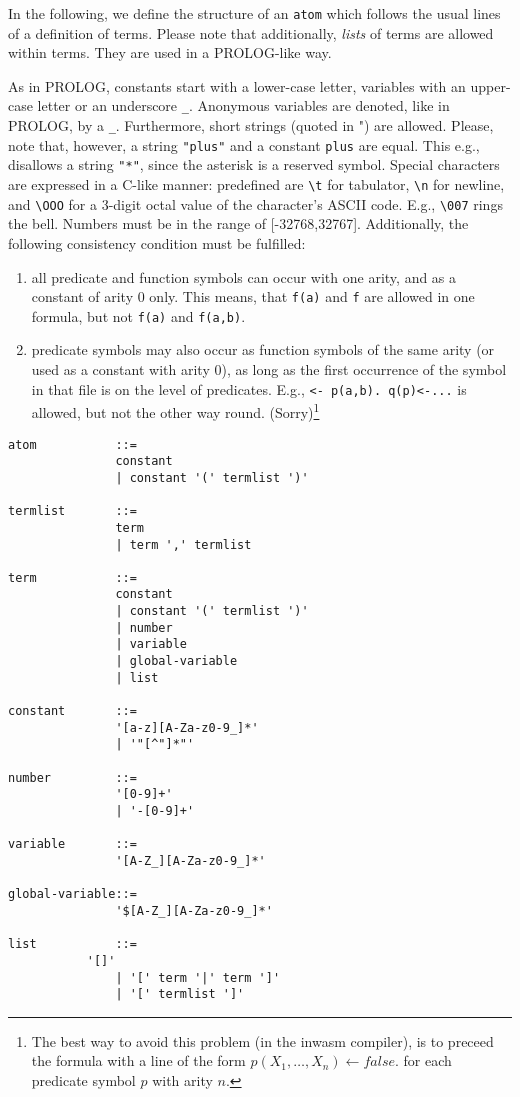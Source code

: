 In the following, we define the structure of an {\tt atom} which
follows the usual lines of a definition of terms. Please note
that additionally, {\em lists\/} of terms are allowed within
terms. They are used in a PROLOG-like way.

As in PROLOG, constants start with a lower-case letter,
variables with an upper-case letter or an underscore {\tt \_}.
Anonymous variables are denoted, like in PROLOG, by a {\tt\_}.
Furthermore, short strings (quoted in ") are allowed. Please, note
that, however, a string {\tt "plus"} and a constant {\tt plus} are
equal. This e.g., disallows a string {\tt "*"}, since the asterisk is
a reserved symbol.
Special characters are expressed in a C-like manner:
predefined are 
\verb+\t+ for tabulator,
\verb+\n+ for newline, and
\verb+\OOO+ for a 3-digit octal value of the character's
ASCII code. E.g., \verb+\007+ rings the bell.
%
Numbers must be in the range of [-32768,32767].
%
Additionally, the following consistency condition must be
fulfilled:
\begin{enumerate}
\item
all predicate and function symbols can occur with one arity, and
as a constant of arity $0$ only. This means, that {\tt f(a)} and
{\tt f} are allowed in one formula, but not {\tt f(a)} and
{\tt f(a,b)}.
\item
predicate symbols may also occur as function symbols of the
same arity (or used as a constant with arity 0), 
as long as the first occurrence
of the symbol in that file is on the level of predicates. E.g.,
{\tt <- p(a,b). q(p)<-...} is allowed, but not the
other way round. (Sorry)\footnote{
	The best way to avoid this problem (in the inwasm compiler),
	is to preceed the formula with a line of the
	form $p(X_1,\ldots,X_n) \leftarrow false.$ for
	each predicate symbol $p$ with arity $n$.
	}
\end{enumerate}
\begin{verbatim}
atom           ::=
               constant
               | constant '(' termlist ')'

termlist       ::=
               term
               | term ',' termlist

term           ::=
               constant
               | constant '(' termlist ')'
               | number
               | variable
               | global-variable
               | list

constant       ::=
               '[a-z][A-Za-z0-9_]*'
               | '"[^"]*"'

number         ::=
               '[0-9]+'
               | '-[0-9]+'

variable       ::=
               '[A-Z_][A-Za-z0-9_]*'

global-variable::=
               '$[A-Z_][A-Za-z0-9_]*'

list           ::=
	       '[]'
               | '[' term '|' term ']'
               | '[' termlist ']'
\end{verbatim}
	
